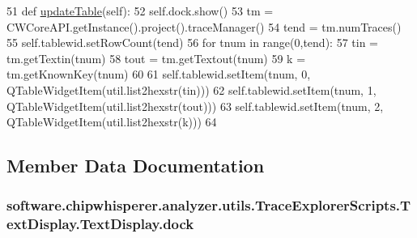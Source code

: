 \begin{DoxyCode}
51     \textcolor{keyword}{def }\hyperlink{classsoftware_1_1chipwhisperer_1_1analyzer_1_1utils_1_1TraceExplorerScripts_1_1TextDisplay_1_1TextDisplay_ad115fe634ef23d41473dce2db1401087}{updateTable}(self):
52         self.dock.show()
53         tm = CWCoreAPI.getInstance().project().traceManager()
54         tend = tm.numTraces()
55         self.tablewid.setRowCount(tend)
56         \textcolor{keywordflow}{for} tnum \textcolor{keywordflow}{in} range(0,tend):
57             tin = tm.getTextin(tnum)
58             tout = tm.getTextout(tnum)
59             k = tm.getKnownKey(tnum)
60 
61             self.tablewid.setItem(tnum, 0, QTableWidgetItem(util.list2hexstr(tin)))
62             self.tablewid.setItem(tnum, 1, QTableWidgetItem(util.list2hexstr(tout)))
63             self.tablewid.setItem(tnum, 2, QTableWidgetItem(util.list2hexstr(k)))
64 
\end{DoxyCode}


\subsection{Member Data Documentation}
\hypertarget{classsoftware_1_1chipwhisperer_1_1analyzer_1_1utils_1_1TraceExplorerScripts_1_1TextDisplay_1_1TextDisplay_a72c2d5327ebfc02f3b4e6866ac18cdb7}{}
\subsubsection[{dock}]{\setlength{\rightskip}{0pt plus 5cm}software.\+chipwhisperer.\+analyzer.\+utils.\+Trace\+Explorer\+Scripts.\+Text\+Display.\+Text\+Display.\+dock}\label{classsoftware_1_1chipwhisperer_1_1analyzer_1_1utils_1_1TraceExplorerScripts_1_1TextDisplay_1_1TextDisplay_a72c2d5327ebfc02f3b4e6866ac18cdb7}
\hypertarget{classsoftware_1_1chipwhisperer_1_1analyzer_1_1utils_1_1TraceExplorerScripts_1_1TextDisplay_1_1TextDisplay_a24bcea32336c8d061e98c8a3cc290fd8}{}
